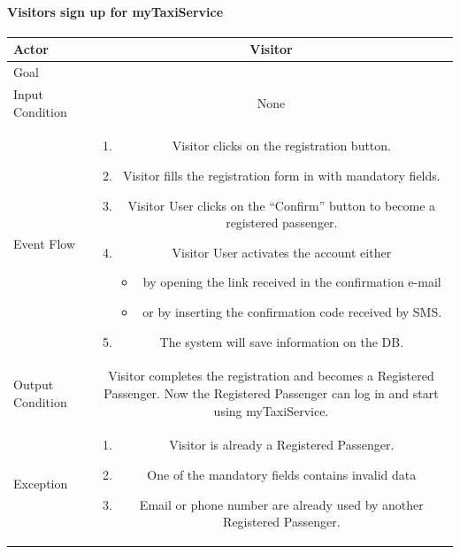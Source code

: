 \documentclass[a4paper,12pt,dvipsnames]{article}%
\newcommand{\usecasetable}[6]{
\begin{center}
\def\arraystretch{1.5}
\begin{tabularx}{\textwidth}{|s|C|}
\hline
Actor & #1\\
\hline
Goal & #2\\
\hline
Input Condition & #3 \\
\hline
Event Flow & #4\\
\hline
Output Condition & #5\\
\hline
Exception & #6\\
\hline
\end{tabularx}
\end{center}
}
\begin{document}
\paragraph{Visitors sign up for myTaxiService}
\usecasetable {Visitor} {} {None} {
\begin{minipage}[b]{11cm}
\begin{enumerate}
\item Visitor clicks on the registration button.
\item Visitor fills the registration form in with mandatory fields.
\item Visitor User clicks on the ``Confirm'' button to become a registered passenger. 
\item Visitor User activates the account either
\begin{itemize}
\item by opening the link received in the confirmation e-mail
\item or by inserting the confirmation code received by SMS.
\end{itemize}
\item The system will save information on the DB.
\end{enumerate}
\end{minipage}} 
{
Visitor completes the registration and becomes a Registered Passenger.
Now the Registered Passenger can log in and start using myTaxiService.
} 
{
\begin{minipage}[b]{11cm}
\begin{enumerate}
\item Visitor is already a Registered Passenger.
\item One of the mandatory fields contains invalid data
\item Email or phone number are already used by another Registered Passenger.
\end{enumerate}
\end{minipage}
}
\end{document}
